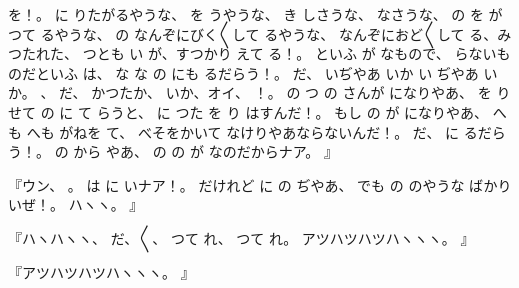 を！。
に
りたがるやうな、
を
うやうな、
き
しさうな、
なさうな、
の
を
がつて
るやうな、
の
なんぞにびく〳〵して
るやうな、
なんぞにおど〳〵して
る、みつたれた、
つとも
い
が、すつかり
えて
る！。
といふ
が
なもので、
らないものだといふ
は、
な
な
の
にも
るだらう！。
だ、
いぢやあ
いか
い
ぢやあ
いか。
、
だ、
かつたか、
いか、オイ、
！。
の
つ
の
さんが
になりやあ、
を
り
せて
の
に
て
らうと、
に
つた
を
り
はすんだ！。
もし
の
が
になりやあ、
へも
へも
がねを
て、
べそをかいて
なけりやあならないんだ！。
だ、
に
るだらう！。
の
から
やあ、
の
の
が
なのだからナア。
』

『ウン、
。
は
に
いナア！。
だけれど
に
の
ぢやあ、
でも
の
のやうな
ばかり
いぜ！。
ハヽヽ。
』

『ハヽハヽヽ、
だ、〳〵、
つて
れ、
つて
れ。
アツハツハツハヽヽヽ。
』

『アツハツハツハヽヽヽ。
』

